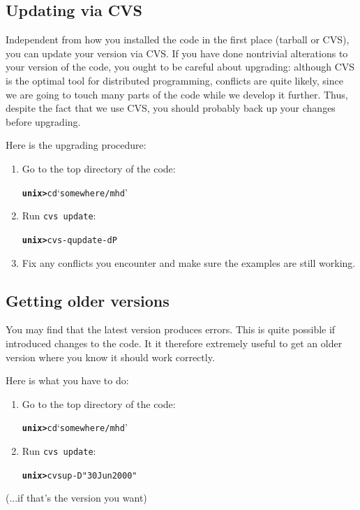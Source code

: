 \documentclass[12pt,twoside,notitlepage,a4paper]{article}
\newcommand{\prompt}[1]{{\ttfamily\bfseries{}#1}}
\newcommand{\code}[1]{\texttt{#1}}
\newcommand{\file}[1]{`\texttt{#1}'}
\newcommand{\command}[1]{\code{#1}\index{#1}}
\newcommand{\cmd}[1]{\command{#1}}
\begin{document}
\subsection{Updating via CVS}

Independent from how you installed the code in the first place (tarball or
CVS), you can update your version via CVS.
If you have done nontrivial alterations to your version of the code, you
ought to be careful about upgrading: although CVS is the optimal tool for
distributed programming, conflicts are quite likely, since we are going to
touch many parts of the code while we develop it further.
Thus, despite the fact that we use CVS, you should probably back up your
changes before upgrading.

Here is the upgrading procedure:
\begin{enumerate}
\item Go to the top directory of the code:
  \begin{alltt}
  \prompt{unix> } cd \file{somewhere/mhd} \
  \end{alltt}
\item Run \cmd{cvs update}:
  \begin{alltt}
  \prompt{unix> } cvs -q update -dP \
  \end{alltt}
\item Fix any conflicts you encounter and make sure the examples are still
  working.
\end{enumerate}


\subsection{Getting older versions}

You may find that the latest version produces errors. This is quite
possible if introduced changes to the code. It it therefore extremely
useful to get an older version where you know it should work correctly.

Here is what you have to do:
\begin{enumerate}
\item Go to the top directory of the code:
  \begin{alltt}
  \prompt{unix> } cd \file{somewhere/mhd} \
  \end{alltt}
\item Run \cmd{cvs update}:
  \begin{alltt}
  \prompt{unix> } cvs up -D "30 Jun 2000"\
  \end{alltt}
\end{enumerate}
(...if that's the version you want)
\end{document}
